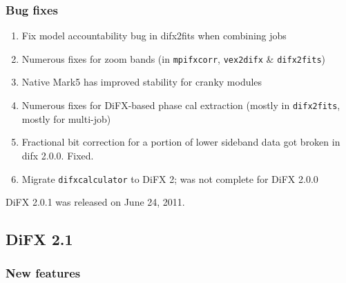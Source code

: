\subsubsection{Bug fixes}

\begin{enumerate}
\item Fix model accountability bug in difx2fits when combining jobs
\item Numerous fixes for zoom bands (in {\tt mpifxcorr}, {\tt vex2difx} \& {\tt difx2fits})
\item Native Mark5 has improved stability for cranky modules
\item Numerous fixes for DiFX-based phase cal extraction (mostly in {\tt difx2fits}, mostly for multi-job)
\item Fractional bit correction for a portion of lower sideband data got broken in difx 2.0.0. Fixed.
\item Migrate {\tt difxcalculator} to DiFX 2; was not complete for DiFX 2.0.0
\end{enumerate}

DiFX 2.0.1 was released on June 24, 2011.

\subsection{DiFX 2.1}

\subsubsection{New features}

